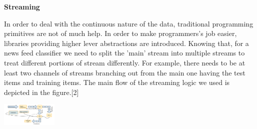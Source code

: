 \begin{center} \textbf{\huge Streaming} \end{center}
In order to deal with the continuous nature of the data, traditional programming primitives are not of much help. In order to make programmers's job easier, libraries providing higher lever abstractions are introduced. Knowing that, for a news feed classifier we need to split the 'main' stream into multiple streams to treat different portions of stream differently. For example, there needs to be at least two channels of streams branching out from the main one having the test items and training items. The main flow of the streaming logic we used is depicted in the figure.[2]\\
\begin{center}
\includegraphics[width=0.2\textwidth]{./time_models/streaming_diagram}
\end{center}
